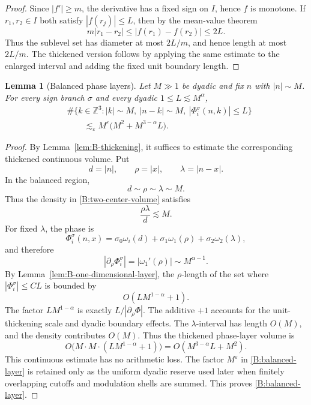 \documentclass[10pt]{amsart}
\numberwithin{equation}{section}
\theoremstyle{plain}
\newtheorem{lemma}[theorem]{Lemma}
\theoremstyle{definition}
\theoremstyle{remark}
\newcommand{\Z}{\mathbb{Z}}
\newcommand{\eps}{\varepsilon}
\begin{document}
\begin{proof}
Since \(|f'|\ge m\), the derivative has a fixed sign on \(I\), hence \(f\) is monotone.  If \(r_1,r_2\in I\) both satisfy \(|f(r_j)|\le L\), then by the mean-value theorem
\[
        m|r_1-r_2|\le |f(r_1)-f(r_2)|\le 2L.
\]
Thus the sublevel set has diameter at most \(2L/m\), and hence length at most \(2L/m\).  The thickened version follows by applying the same estimate to the enlarged interval and adding the fixed unit boundary length.
\end{proof}

\begin{lemma}[Balanced phase layers]\label{lem:B-balanced-layer}
Let \(M\gg1\) be dyadic and fix \(n\) with \(|n|\sim M\).  For every sign branch \(\sigma\) and every dyadic \(1\le L\lesssim M^\alpha\),
\begin{equation}\label{B:balanced-layer}
\begin{aligned}
&\#\{k\in\Z^3: |k|\sim M,\ |n-k|\sim M,
       \ |\Phi_i^\sigma(n,k)|\le L\} \\
&\qquad\lesssim_\eps M^\eps\bigl(M^2+M^{3-\alpha}L\bigr).
\end{aligned}
\end{equation}
\end{lemma}

\begin{proof}
By Lemma~\ref{lem:B-thickening}, it suffices to estimate the corresponding thickened continuous volume.  Put
\[
        d=|n|,
        \qquad
        \rho=|x|,
        \qquad
        \lambda=|n-x|.
\]
In the balanced region,
\[
        d\sim\rho\sim\lambda\sim M.
\]
Thus the density in \eqref{B:two-center-volume} satisfies
\[
        \frac{\rho\lambda}{d}\lesssim M.
\]
For fixed \(\lambda\), the phase is
\[
        \Phi_i^\sigma(n,x)
        =
        \sigma_0\omega_i(d)+\sigma_1\omega_1(\rho)+\sigma_2\omega_2(\lambda),
\]
and therefore
\[
        |\partial_\rho\Phi_i^\sigma|=|\omega_1'(\rho)|\sim M^{\alpha-1}.
\]
By Lemma~\ref{lem:B-one-dimensional-layer}, the \(\rho\)-length of the set where \(|\Phi_i^\sigma|\le CL\) is bounded by
\[
        O(LM^{1-\alpha}+1).
\]
The factor \(LM^{1-\alpha}\) is exactly \(L/|\partial_\rho\Phi|\).  The additive \(+1\) accounts for the unit-thickening scale and dyadic boundary effects.  The \(\lambda\)-interval has length \(O(M)\), and the density contributes \(O(M)\).  Thus the thickened phase-layer volume is
\[
        O\bigl(M\cdot M\cdot(LM^{1-\alpha}+1)\bigr)
        =O(M^{3-\alpha}L+M^2).
\]
This continuous estimate has no arithmetic loss.  The factor \(M^\eps\) in \eqref{B:balanced-layer} is retained only as the uniform dyadic reserve used later when finitely overlapping cutoffs and modulation shells are summed.  This proves \eqref{B:balanced-layer}.
\end{proof}
\end{document}
